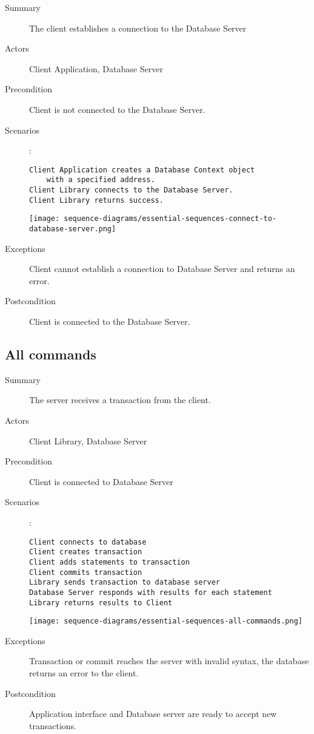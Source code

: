 \documentclass[a4paper]{report}
\begin{document}
	\begin{description}
		\item[Summary] The client establishes a connection to the Database Server
		\item[Actors] Client Application, Database Server 
		\item[Precondition] Client is not connected to the Database Server.
		\item[Scenarios] :
		
		\begin{lstlisting}
Client Application creates a Database Context object
	with a specified address.
Client Library connects to the Database Server.
Client Library returns success.
		\end{lstlisting}

		\begin{center}
			\texttt{[image: sequence-diagrams/essential-sequences-connect-to-database-server.png]}
		\end{center}

		\item[Exceptions] Client cannot establish a connection to Database Server and returns an error.
		\item[Postcondition] Client is connected to the Database Server.
	\end{description}

	\pagebreak

	\subsection{All commands}

	\begin{description}
		\item[Summary] The server receives a transaction from the client.
		\item[Actors] Client Library, Database Server
		\item[Precondition] Client is connected to Database Server
		\item[Scenarios] :

		\begin{lstlisting}
Client connects to database
Client creates transaction
Client adds statements to transaction
Client commits transaction
Library sends transaction to database server
Database Server responds with results for each statement
Library returns results to Client
		\end{lstlisting}

		\begin{center}
			\texttt{[image: sequence-diagrams/essential-sequences-all-commands.png]}
		\end{center}

		\item[Exceptions] Transaction or commit reaches the server with invalid syntax, the database returns an error to the client.
		\item[Postcondition] Application interface and Database server are ready to accept new transactions.
	\end{description}
	
\end{document}
